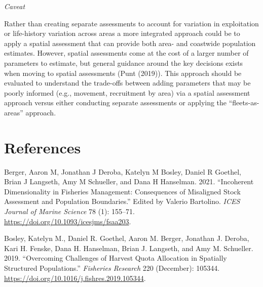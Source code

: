 \documentclass[11pt,
  english,
  letterpaper,
]{article}
\begin{document}
\leavevmode\tagmcend\tagstructend\par


\emph{Caveat}

\leavevmode\tagmcend\tagstructend\par


Rather than creating separate assessments to account for variation in exploitation or life-history variation across areas a more integrated approach could be to apply a spatial assessment that can provide both area- and coastwide population estimates. However, spatial assessments come at the cost of a larger number of parameters to estimate, but general guidance around the key decisions exists when moving to spatial assessments (Punt {(2019)\leavevmode\tagmcend\tagstructend}). This approach should be evaluated to understand the trade-offs between adding parameters that may be poorly informed (e.g., movement, recruitment by area) via a spatial assessment approach versus either conducting separate assessments or applying the ``fleets-as-areas'' approach.

\leavevmode\tagmcend\tagstructend\par

\clearpage

\clearpage


\hypertarget{references}{%
\section{References}\label{references}}

\leavevmode\tagmcend\tagstructend


\hypertarget{refs}{}
\leavevmode\hypertarget{ref-berger_incoherent_2021}{}%
Berger, Aaron M, Jonathan J Deroba, Katelyn M Bosley, Daniel R Goethel, Brian J Langseth, Amy M Schueller, and Dana H Hanselman. 2021. ``Incoherent Dimensionality in Fisheries Management: Consequences of Misaligned Stock Assessment and Population Boundaries.'' Edited by Valerio Bartolino. \emph{ICES Journal of Marine Science} 78 (1): 155--71. \url{https://doi.org/10.1093/icesjms/fsaa203}.

\leavevmode\hypertarget{ref-bosley_overcoming_2019}{}%
Bosley, Katelyn M., Daniel R. Goethel, Aaron M. Berger, Jonathan J. Deroba, Kari H. Fenske, Dana H. Hanselman, Brian J. Langseth, and Amy M. Schueller. 2019. ``Overcoming Challenges of Harvest Quota Allocation in Spatially Structured Populations.'' \emph{Fisheries Research} 220 (December): 105344. \url{https://doi.org/10.1016/j.fishres.2019.105344}.
\end{document}
